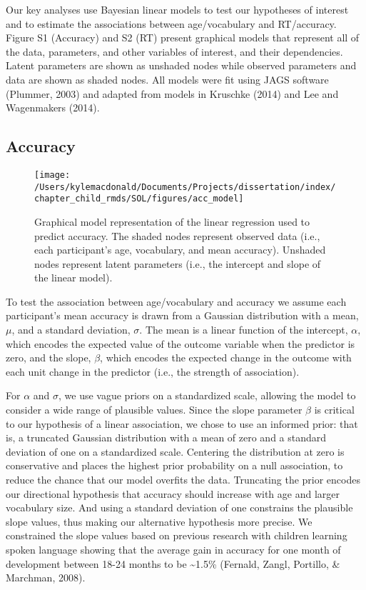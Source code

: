 \documentclass[oneside]{report}
\begin{document}
Our key analyses use Bayesian linear models to test our hypotheses of
interest and to estimate the associations between age/vocabulary and
RT/accuracy. Figure S1 (Accuracy) and S2 (RT) present graphical models
that represent all of the data, parameters, and other variables of
interest, and their dependencies. Latent parameters are shown as
unshaded nodes while observed parameters and data are shown as shaded
nodes. All models were fit using JAGS software (Plummer, 2003) and
adapted from models in Kruschke (2014) and Lee and Wagenmakers (2014).

\subsection{Accuracy}\label{accuracy}
\begin{figure}[t]

{\centering \texttt{[image: /Users/kylemacdonald/Documents/Projects/dissertation/index/chapter\_child\_rmds/SOL/figures/acc\_model]} 

}

\caption[Graphical representation of the accuracy model.]{Graphical model representation of the linear regression used to predict accuracy. The shaded nodes represent observed data (i.e., each participant's age, vocabulary, and mean accuracy). Unshaded nodes represent latent parameters (i.e., the intercept and slope of the linear model).}\label{fig:unnamed-chunk-8}
\end{figure}
To test the association between age/vocabulary and accuracy we assume
each participant's mean accuracy is drawn from a Gaussian distribution
with a mean, \(\mu\), and a standard deviation, \(\sigma\). The mean is
a linear function of the intercept, \(\alpha\), which encodes the
expected value of the outcome variable when the predictor is zero, and
the slope, \(\beta\), which encodes the expected change in the outcome
with each unit change in the predictor (i.e., the strength of
association).

For \(\alpha\) and \(\sigma\), we use vague priors on a standardized
scale, allowing the model to consider a wide range of plausible values.
Since the slope parameter \(\beta\) is critical to our hypothesis of a
linear association, we chose to use an informed prior: that is, a
truncated Gaussian distribution with a mean of zero and a standard
deviation of one on a standardized scale. Centering the distribution at
zero is conservative and places the highest prior probability on a null
association, to reduce the chance that our model overfits the data.
Truncating the prior encodes our directional hypothesis that accuracy
should increase with age and larger vocabulary size. And using a
standard deviation of one constrains the plausible slope values, thus
making our alternative hypothesis more precise. We constrained the slope
values based on previous research with children learning spoken language
showing that the average gain in accuracy for one month of development
between 18-24 months to be \textasciitilde{}1.5\% (Fernald, Zangl,
Portillo, \& Marchman, 2008).
\end{document}
